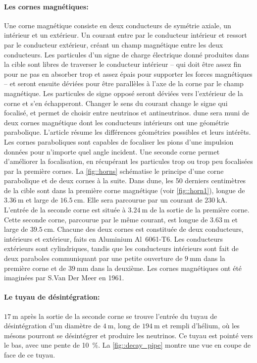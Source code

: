             \paragraph{Les cornes magnétiques:} Une corne magnétique consiste en deux conducteurs de symétrie axiale, un intérieur et un extérieur. Un courant entre par le conducteur intérieur et ressort par le conducteur extérieur, créant un champ magnétique entre les deux conducteurs. Les particules d'un signe de charge électrique donné produites dans la cible sont libres de traverser le conducteur intérieur -- qui doit être assez fin pour ne pas en absorber trop et assez épais pour supporter les forces magnétiques -- et seront ensuite déviées pour être parallèles à l'axe de la corne par le champ magnétique. Les particules de signe opposé seront déviées vers l'extérieur de la corne et s'en échapperont. Changer le sens du courant change le signe qui focalisé, et permet de choisir entre neutrinos et antineutrinos. \gls{dune} sera muni de deux cornes magnétique dont les conducteurs intérieurs ont une géométrie parabolique. L'article \cite{Kopp2006} résume les différences géométries possibles et leurs intérêts. Les cornes paraboliques sont capables de focaliser les pions d'une impulsion données pour n'importe quel angle incident. Une seconde corne permet d'améliorer la focalisation, en récupérant les particules trop ou trop peu focalisées par la première cornes. La \autoref{fig::horns} schématise le principe d'une corne parabolique et de deux cornes à la suite.
            Dans \gls{dune}, les 50 derniers centimètres de la cible sont dans la première corne magnétique (voir \autoref{fig::horn1}), longue de $\SI{3.36}{\meter}$ et large de $\SI{16.5}{\centi\meter}$. Elle sera parcourue par un courant de $\SI{230}{\kilo\ampere}$. L'entrée de la seconde corne est située à $\SI{3.24}{\meter}$ de la sortie de la première corne. Cette seconde corne, parcourue par le même courant, est longue de  $\SI{3.63}{\meter}$ et large de $\SI{39.5}{\centi\meter}$. Chacune des deux cornes est constituée de deux conducteurs, intérieurs et extérieur, faits en Aluminium Al~6061-T6. Les conducteurs extérieurs sont cylindriques, tandis que les conducteurs intérieurs sont fait de deux paraboles communiquant par une petite ouverture de $\SI{9}{\milli\meter}$ dans la première corne et de $\SI{39}{\milli\meter}$ dans la deuxième. Les cornes magnétiques ont été imaginées par S.Van Der Meer en 1961\cite{VanDerMeer1961}.
            
            \paragraph{Le tuyau de désintégration:} $\SI{17}{\meter}$ après la sortie de la seconde corne se trouve l'entrée du tuyau de désintégration d'un diamètre de $\SI{4}{\meter}$, long de $\SI{194}{\meter}$ et rempli d'hélium, où les mésons pourront se désintégrer et produire les neutrinos. Ce tuyau est pointé vers le bas, avec une pente de 10~\%. La \autoref{fig::decay_pipe} montre une vue en coupe de face de ce tuyau. 
            
